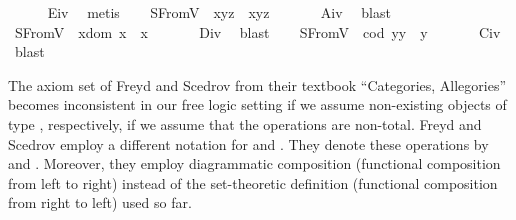 \begin{isabellebody}
%
\isadelimproof
\ \ \ \ %
\endisadelimproof
%
\isatagproof
{}\isamarkupfalse%
\ E\isactrlsub i\isactrlsub v\ \isamarkupfalse%
\ metis%
\endisatagproof
{\isafoldproof}%
%
\isadelimproof
\isanewline
%
\endisadelimproof
\ \ \isamarkupfalse%
\ S{}FromV{\isacharcolon}\ \ {\isachardoublequoteopen}x{\isasymcdot}{\isacharparenleft}y{\isasymcdot}z{\isacharparenright}\ {\isasymcong}\ {\isacharparenleft}x{\isasymcdot}y{\isacharparenright}{\isasymcdot}z{\isachardoublequoteclose}\ \isanewline
%
\isadelimproof
\ \ \ \ %
\endisadelimproof
%
\isatagproof
{}\isamarkupfalse%
\ A\isactrlsub i\isactrlsub v\ \isamarkupfalse%
\ blast%
\endisatagproof
{\isafoldproof}%
%
\isadelimproof
\isanewline
%
\endisadelimproof
\ \ \isamarkupfalse%
\ S{}FromV{\isacharcolon}\ \ {\isachardoublequoteopen}x{\isasymcdot}{\isacharparenleft}dom\ x{\isacharparenright}\ {\isasymcong}\ x{\isachardoublequoteclose}\ \isanewline
%
\isadelimproof
\ \ \ \ %
\endisadelimproof
%
\isatagproof
{}\isamarkupfalse%
\ D\isactrlsub i\isactrlsub v\ \isamarkupfalse%
\ blast%
\endisatagproof
{\isafoldproof}%
%
\isadelimproof
\isanewline
%
\endisadelimproof
\ \ \isamarkupfalse%
\ S{}FromV{\isacharcolon}\ \ {\isachardoublequoteopen}{\isacharparenleft}cod\ y{\isacharparenright}{\isasymcdot}y\ {\isasymcong}\ y{\isachardoublequoteclose}\ \isanewline
%
\isadelimproof
\ \ \ \ %
\endisadelimproof
%
\isatagproof
{}\isamarkupfalse%
\ C\isactrlsub i\isactrlsub v\ \isamarkupfalse%
\ blast%
\endisatagproof
{\isafoldproof}%
%
\isadelimproof
%
\endisadelimproof
%
\isamarkuptrue%
%
\begin{isamarkuptext}%
The axiom set of Freyd and Scedrov from their textbook
 ``Categories, Allegories'' \cite{FreydScedrov90} becomes inconsistent in our free logic setting if we assume 
  non-existing objects of type , respectively, if we assume that the operations are 
  non-total.  Freyd and Scedrov employ a different notation for 
   and . They denote these operations by  
  and . Moreover, they employ diagrammatic composition  
  (functional composition from left to right) instead of the set-theoretic 
  definition  (functional composition from right to left) used so far.
 

\end{isamarkuptext}
\end{isabellebody}
